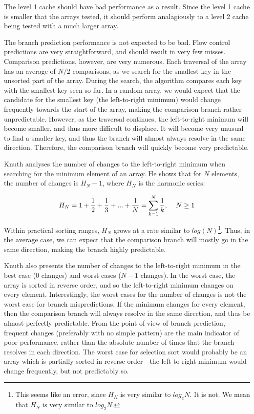 The level 1 cache should have bad performance as a result. Since the level 1
cache is smaller that the arrays tested, it should perform analagiously to a
level 2 cache being tested with a much larger array.

\label{selection branches harmonics}
The branch prediction performance is not expected to be bad. Flow control
predictions are very straightforward, and should result in very few misses.
Comparison predictions, however, are very numerous. Each traversal of the array
has an average of $N/2$ comparisons, as we search for the smallest key in the
unsorted part of the array. During the search, the algorithm compares each key
with the smallest key seen so far. In a random array, we would expect that the
candidate for the smallest key (the left-to-right minimum) would change
frequently towards the start of the array, making the comparison branch rather
unpredictable. However, as the traversal continues, the left-to-right minimum
will become smaller, and thus more difficult to displace. It will become very
unusual to find a smaller key, and thus the branch will almost always resolve in
the same direction. Therefore, the comparison branch will quickly become very
predictable.

Knuth \cite{Knuth97} analyses the number of changes to the left-to-right minimum
when searching for the minimum element of an array. He shows that for $N$
elements, the number of changes is $H_N - 1$, where $H_N$ is the harmonic
series:

$$H_N = 1 + \frac{1}{2} + \frac{1}{3} + ... + \frac{1}{N} =  \sum_{k=1}^{N}
\frac{1}{k},  \hspace{0.4cm}  N \geq 1$$

Within practical sorting ranges, $H_N$ grows at a rate similar to
$log(N)$\footnote{This seems like an error, since $H_N$ is very similar to
$log_eN$. It is not. We mean that $H_N$ is very similar to $log_2N$.}. Thus, in
the average case, we can expect that the comparison branch will mostly go in the
same direction, making the branch highly predictable.

Knuth also presents the number of changes to the left-to-right minimum in the
best case (0 changes) and worst cases ($N-1$ changes). In the worst case, the
array is sorted in reverse order, and so the left-to-right minimum changes on
every element. Interestingly, the worst cases for the number of changes is not
the worst case for branch mispredictions. If the minimum changes for every
element, then the comparison branch will always resolve in the same direction,
and thus be almost perfectly predictable. From the point of view of branch
prediction, frequent changes (preferably with no simple pattern) are the main
indicator of poor performance, rather than the absolute number of times that the
branch resolves in each direction. The worst case for selection sort would
probably be an array which is partially sorted in reverse order - the
left-to-right minimum would change frequently, but not predictably so.

